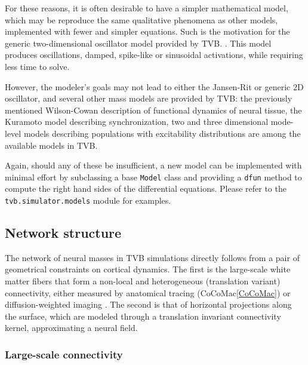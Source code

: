 	For these reasons, it is often desirable to have a simpler mathematical 
	model, which may be reproduce the same qualitative phenomena as other 
	models, implemented with fewer and simpler equations. Such is the motivation
	for the generic two-dimensional oscillator model provided by TVB. 
	. This model produces oscillations, damped, spike-like or 
	sinusoidal activations, while requiring less time to solve.

	However, the modeler's goals may not lead to either the Jansen-Rit or 
	generic 2D oscillator, and several other mass models are provided by TVB:
	the previously mentioned Wilson-Cowan description of functional dynamics of
	neural tissue, the Kuramoto model describing synchronization, two and 
	three dimensional mode-level models describing populations with 
	excitability distributions \cite{Stefanescu_2011, Stefanescu_2008} are
	among the available models in TVB. 

	Again, should any of these be insufficient, a new model can be implemented
	with minimal effort by subclassing a base \texttt{Model} class and providing a 
	\texttt{dfun} method to compute the right hand sides of the differential 
	equations. Please refer to the \texttt{tvb.simulator.models} module for 
	examples.
	

\subsection{Network structure}

    The network of neural masses in TVB simulations directly follows from  a
    pair of geometrical constraints on cortical dynamics. The first is the
    large-scale white matter fibers that form a non-local and heterogeneous
    (translation variant) connectivity, either measured by anatomical tracing
    (CoCoMac\ref{CoCoMac}) or diffusion-weighted imaging \cite{Hagmann_2008,
    Honey_2009, Bastiani_2012}. The second is that of horizontal projections
    along the surface, which are modeled through a translation invariant
     connectivity kernel,
    approximating a neural field.

	\subsubsection{Large-scale connectivity}

